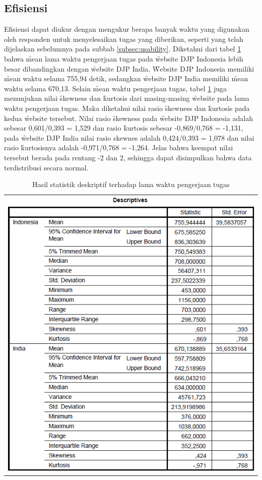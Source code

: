 \subsection{Efisiensi}
Efisiensi dapat diukur dengan mengukur berapa banyak waktu yang digunakan oleh responden untuk menyelesaikan tugas yang diberikan, seperti yang telah dijelaskan sebelumnya pada subbab \ref{subsec:usability}. Diketahui dari tabel \ref{tab:descwaktu} bahwa \f{mean} lama waktu pengerjaan tugas pada \f{website} DJP Indonesia lebih besar dibandingkan dengan \f{website} DJP India. \f{Website} DJP Indonesia memiliki \f{mean} waktu selama 755,94 detik, sedangkan \f{website} DJP India memiliki \f{mean} waktu selama 670,13. Selain \f{mean} waktu pengerjaan tugas, tabel \ref{tab:descwaktu} juga menunjukan nilai \f{skewness} dan \f{kurtosis} dari masing-masing \f{website} pada lama waktu pengerjaan tugas. Maka diketahui nilai rasio \f{skewness} dan \f{kurtosis} pada kedua \f{website} tersebut. Nilai rasio \f{skewness} pada \f{website} DJP Indonesia adalah sebesar 0,601/0,393 = 1,529 dan rasio \f{kurtosis} sebesar -0,869/0,768 = -1,131, pada \f{website} DJP India nilai rasio skewnes adalah 0,424/0,393 = 1,078 dan nilai rasio \f{kurtosis}nya adalah -0,971/0,768 = -1,264. Jelas bahwa keempat nilai tersebut berada pada rentang -2 dan 2, sehingga dapat disimpulkan bahwa data terdistribusi secara normal. 
\begin{table}
	\centering
	\caption{Hasil statistik deskriptif terhadap lama waktu pengerjaan tugas}
	\label{tab:descwaktu}
	\begin{tabular}{c}
		\includegraphics[width=\textwidth]
		{pics/waktudesc.PNG}
	\end{tabular}
\end{table}
